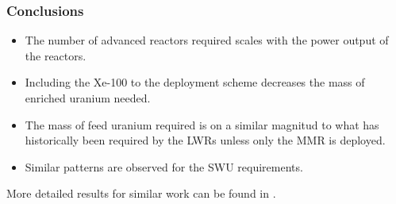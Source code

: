 \begin{frame}
      \frametitle{Conclusions}
      \begin{itemize}
        \item The number of advanced reactors required scales with the 
              power output of the reactors. 
        \item Including the Xe-100 to the deployment scheme decreases 
              the mass of enriched uranium needed.
        \item The mass of feed uranium required is on a similar magnitud
              to what has historically been required by the \glspl{LWR} 
              unless only the \gls{MMR} is deployed. 
        \item Similar patterns are observed for the \gls{SWU} requirements. 
      \end{itemize}
      More detailed results for similar work can be found in \cite{bachmann_enrichment_2021}.
\end{frame}